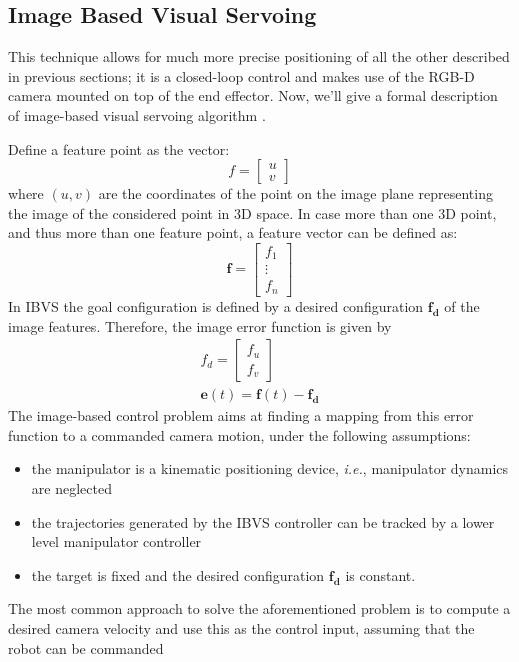 \subsection{Image Based Visual Servoing}\label{subsec:visualServoing}
This technique allows for much more precise positioning of all the other described in previous sections; it is a closed-loop control and makes use of the RGB-D camera mounted on top of the end effector. Now, we'll give a formal description of image-based visual servoing algorithm \parencite{imageBasedVisualServo}.
\par
Define a feature point as the vector: 
\[
f = \left[\begin{array}{c}u \\v\end{array}\right]
\]
where $(u,v)$ are the coordinates of the point on the image plane representing the image of the considered point in 3D space. In case more than one 3D point, and thus more than one feature point, a feature vector can be defined as:
\[
\boldsymbol{f} = \left[\begin{array}{c}f_1 \\ \vdots \\ f_n\end{array}\right]
\]
In IBVS the goal configuration is defined by a desired configuration $\boldsymbol{f_d}$ of the image features. Therefore, the image error function is given by
\begin{align*}
f_d=\left[\begin{array}{c} f_u \\ f_v \end{array}\right] \\
\boldsymbol{e}(t)=\boldsymbol{f}(t)-\boldsymbol{f_d}
\end{align*}
The image-based control problem aims at finding a mapping from this error function to a
commanded camera motion, under the following assumptions:
\begin{itemize}
	\item the manipulator is a kinematic positioning device, \textit{i.e.}, manipulator dynamics are neglected
	\item the trajectories generated by the IBVS controller can be tracked by a lower level
manipulator controller
	\item the target is fixed and the desired configuration $\boldsymbol{f_d}$ is constant.
\end{itemize}
The most common approach to solve the aforementioned problem is to compute a desired
camera velocity and use this as the control input, assuming that the robot can be commanded
